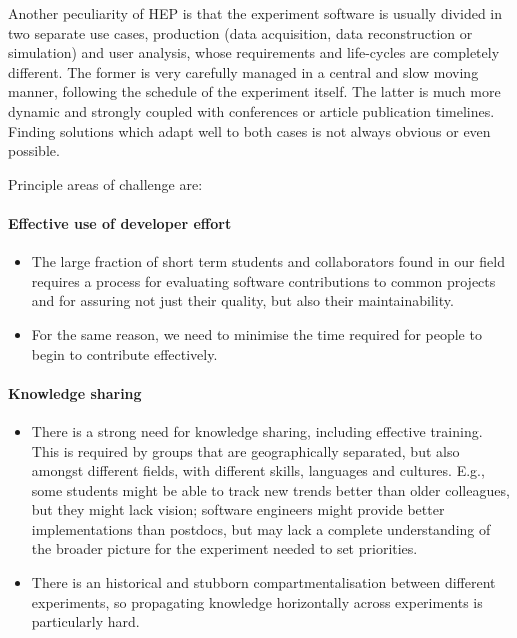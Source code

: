\documentclass[12pt,a4paper]{article}
\begin{document}
Another peculiarity of HEP is that the experiment software is
usually divided in two separate use cases, production (data acquisition,
data reconstruction or simulation) and user analysis, whose requirements
and life-cycles are completely different. The former is very carefully
managed in a central and slow moving manner, following the schedule of the
experiment itself. The latter is much more dynamic and strongly coupled
with conferences or article publication timelines. Finding solutions
which adapt well to both cases is not always obvious or even possible.

Principle areas of challenge are:

\paragraph{Effective use of developer effort}

\begin{itemize}
\item
    The large fraction of short term students and collaborators
  found in our field requires a process for evaluating software
  contributions to common projects and for assuring not just their
  quality, but also their maintainability.
  \item
    For the same reason, we need to minimise the time required for people
  to begin to contribute effectively.
\end{itemize}

\paragraph{Knowledge sharing}

\begin{itemize}
\item
    There is a strong need for knowledge sharing, including effective
  training. This is required by groups that are geographically
  separated, but also amongst different fields, with different skills,
  languages and cultures. E.g., some students might be able to track new
  trends better than older colleagues, but they might lack vision;
  software engineers might provide better implementations than
  postdocs, but may lack a complete understanding of the broader
  picture for the experiment needed to set priorities.
  \item
    There is an historical and stubborn compartmentalisation between
  different experiments, so propagating knowledge horizontally across
  experiments is particularly hard.
\end{itemize}
\end{document}
